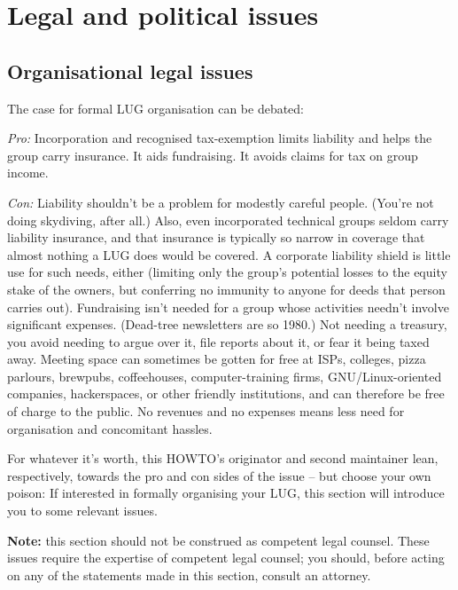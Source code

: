 \documentclass{HOWTO}
\begin{document}
\section{Legal and political issues}






\subsection{Organisational legal issues}

The case for formal LUG organisation can be debated:

{\itshape Pro:\/} Incorporation and recognised tax-exemption limits
liability and helps the group carry insurance.  It aids fundraising.
It avoids claims for tax on group income.

{\itshape Con:\/} Liability shouldn't be a problem for modestly careful
people.  (You're not doing skydiving, after all.)  Also, even
incorporated technical groups seldom carry liability insurance, and that
insurance is typically so narrow in coverage that almost nothing a LUG
does would be covered.  A corporate liability shield is little use for
such needs, either (limiting only the group's potential losses to the
equity stake of the owners, but conferring no immunity to anyone for 
deeds that person carries out).  Fundraising isn't needed for a group whose
activities needn't involve significant expenses.  (Dead-tree newsletters
are so 1980.)  Not needing a treasury, you avoid needing to argue over
it, file reports about it, or fear it being taxed away. Meeting space
can sometimes be gotten for free at ISPs, colleges, pizza parlours,
brewpubs, coffeehouses, computer-training firms, GNU/Linux-oriented
companies, hackerspaces, or other friendly institutions, and can
therefore be free of charge to the public.  No revenues and no expenses
means less need for organisation and concomitant hassles.

For whatever it's worth, this HOWTO's originator and second maintainer lean,
respectively, towards the pro and con sides of the issue -- but choose
your own poison:  If interested in formally organising your LUG, this
section will introduce you to some relevant issues.

{\bfseries Note:} this section should not be construed as competent legal
counsel. These issues require the expertise of competent legal
counsel; you should, before acting on any of the statements made in
this section, consult an attorney.
\end{document}
